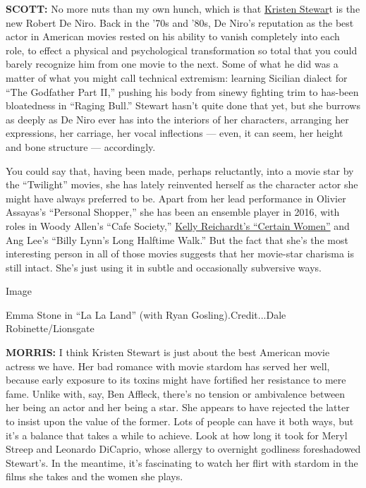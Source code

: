 \textbf{SCOTT:} No more nuts than my own hunch, which is that
\href{https://www.nytimes3xbfgragh.onion/2016/08/17/t-magazine/entertainment/kristen-stewart-the-good-bad-girl.html}{Kristen
Stewar}t is the new Robert De Niro. Back in the '70s and '80s, De Niro's
reputation as the best actor in American movies rested on his ability to
vanish completely into each role, to effect a physical and psychological
transformation so total that you could barely recognize him from one
movie to the next. Some of what he did was a matter of what you might
call technical extremism: learning Sicilian dialect for ``The Godfather
Part II,'' pushing his body from sinewy fighting trim to has-been
bloatedness in ``Raging Bull.'' Stewart hasn't quite done that yet, but
she burrows as deeply as De Niro ever has into the interiors of her
characters, arranging her expressions, her carriage, her vocal
inflections --- even, it can seem, her height and bone structure ---
accordingly.

You could say that, having been made, perhaps reluctantly, into a movie
star by the ``Twilight'' movies, she has lately reinvented herself as
the character actor she might have always preferred to be. Apart from
her lead performance in Olivier Assayas's ``Personal Shopper,'' she has
been an ensemble player in 2016, with roles in Woody Allen's ``Cafe
Society,''
\href{https://www.nytimes3xbfgragh.onion/2016/10/16/magazine/the-quiet-menace-of-kelly-reichardts-feminist-westerns.html}{Kelly
Reichardt's ``Certain Women''} and Ang Lee's ``Billy Lynn's Long
Halftime Walk.'' But the fact that she's the most interesting person in
all of those movies suggests that her movie-star charisma is still
intact. She's just using it in subtle and occasionally subversive ways.

Image

Emma Stone in ``La La Land'' (with Ryan Gosling).Credit...Dale
Robinette/Lionsgate

\textbf{MORRIS:} I think Kristen Stewart is just about the best American
movie actress we have. Her bad romance with movie stardom has served her
well, because early exposure to its toxins might have fortified her
resistance to mere fame. Unlike with, say, Ben Affleck, there's no
tension or ambivalence between her being an actor and her being a star.
She appears to have rejected the latter to insist upon the value of the
former. Lots of people can have it both ways, but it's a balance that
takes a while to achieve. Look at how long it took for Meryl Streep and
Leonardo DiCaprio, whose allergy to overnight godliness foreshadowed
Stewart's. In the meantime, it's fascinating to watch her flirt with
stardom in the films she takes and the women she plays.

